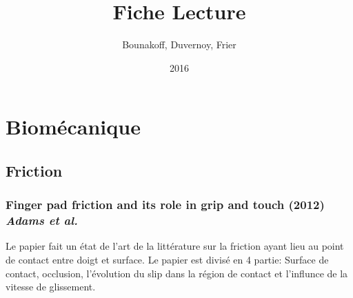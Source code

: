 \documentclass{article}
\title{Fiche Lecture}
\author{Bounakoff, Duvernoy, Frier}
\date{2016}
\begin{document}
	\maketitle
	\section{Biom\'{e}canique}
	\subsection{Friction}
	\subsubsection {Finger pad friction and its role in grip and touch (2012) \textit{Adams et al.} }
	Le papier fait un \'{e}tat de l'art de la litt\'{e}rature sur la friction ayant lieu au point de contact entre doigt et surface.
	Le papier est divis\'{e} en 4 partie: Surface de contact, occlusion, l'\'{e}volution du slip dans la r\'{e}gion de contact et l'influnce de la vitesse de glissement.
\end{document}

